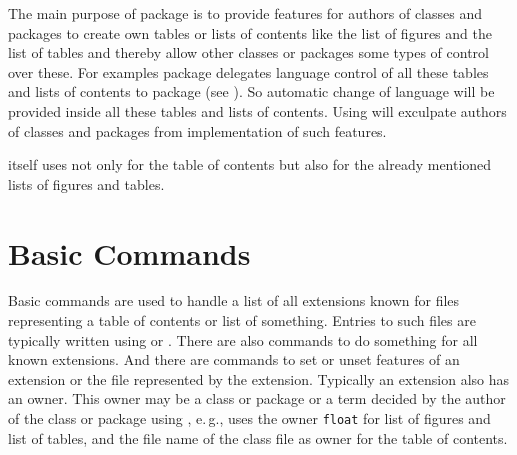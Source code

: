 %
%
%
%
The main purpose of package  is to provide features for
authors of classes and packages to create own tables or lists of contents like
the list of figures and the list of tables and thereby allow other classes or
packages some types of control over these. For examples package
 delegates language control of all these tables and lists of
contents to package  (see
\cite{package:babel}). So automatic change of language will be provided
inside all these tables and lists of contents. Using  will
exculpate authors of classes and packages from implementation of such
features.

\KOMAScript{} itself uses  not only for the table of
contents but also for the already mentioned lists of figures and tables.

\section{Basic Commands}
\label{sec:tocbasic.basics}

Basic commands are used to handle a list of all extensions known for files representing a table
of contents or list of something.  Entries to such files are typically written
using  or .  There are also
commands to do something for all known extensions.  And there are commands to
set or unset features of an extension or the file represented by the
extension.  Typically an extension also has an owner.
This owner may be a class or package or a term decided by the author of the
class or package using , e.\,g., \KOMAScript{} uses the
owner \texttt{float} for list of figures and list of tables, and the file name
of the class file as owner for the table of contents.

